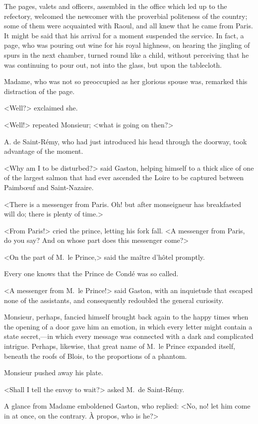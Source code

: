 The pages, valets and officers, assembled in the office which led up to the refectory, welcomed the newcomer with the proverbial politeness of the country; some of them were acquainted with Raoul, and all knew that he came from Paris. It might be said that his arrival for a moment suspended the service. In fact, a page, who was pouring out wine for his royal highness, on hearing the jingling of spurs in the next chamber, turned round like a child, without perceiving that he was continuing to pour out, not into the glass, but upon the tablecloth.

Madame, who was not so preoccupied as her glorious spouse was, remarked this distraction of the page.

<Well?> exclaimed she.

<Well!> repeated Monsieur; <what is going on then?>

A. de Saint-Rémy, who had just introduced his head through the doorway, took advantage of the moment.

<Why am I to be disturbed?> said Gaston, helping himself to a thick slice of one of the largest salmon that had ever ascended the Loire to be captured between Paimbœuf and Saint-Nazaire.

<There is a messenger from Paris. Oh! but after monseigneur has breakfasted will do; there is plenty of time.>

<From Paris!> cried the prince, letting his fork fall. <A messenger from Paris, do you say? And on whose part does this messenger come?>

<On the part of M.~le Prince,> said the maître d'hôtel promptly.

Every one knows that the Prince de Condé was so called.

<A messenger from M.~le Prince!> said Gaston, with an inquietude that escaped none of the assistants, and consequently redoubled the general curiosity.

Monsieur, perhaps, fancied himself brought back again to the happy times when the opening of a door gave him an emotion, in which every letter might contain a state secret,—in which every message was connected with a dark and complicated intrigue. Perhaps, likewise, that great name of M.~le Prince expanded itself, beneath the roofs of Blois, to the proportions of a phantom.

Monsieur pushed away his plate.

<Shall I tell the envoy to wait?> asked M.~de Saint-Rémy.

A glance from Madame emboldened Gaston, who replied: <No, no! let him come in at once, on the contrary. À propos, who is he?>

